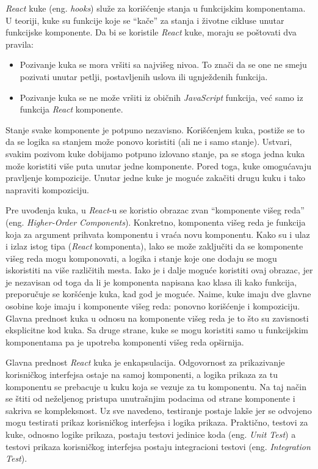 \textit{React} kuke (eng. \textit{hooks}) služe za korišćenje stanja u funkcijskim komponentama. U teoriji, kuke su funkcije 
koje se “kače” za stanja i životne cikluse unutar funkcijske komponente. Da bi se koristile \textit{React} kuke, moraju se 
poštovati dva pravila:
\begin{itemize}
    \item Pozivanje kuka se mora vršiti sa najvišeg nivoa. To znači da se one ne smeju pozivati unutar petlji, 
    postavljenih uslova ili ugnježdenih funkcija.
    \item Pozivanje kuka se ne može vršiti iz običnih \textit{JavaScript} funkcija, već samo iz funkcija \textit{React} komponente.
\end{itemize}

Stanje svake komponente je potpuno nezavisno. Korišćenjem kuka, postiže se to da se logika sa stanjem može ponovo koristiti 
(ali ne i samo stanje). Ustvari, svakim pozivom kuke dobijamo potpuno izlovano stanje, pa se stoga jedna kuka može koristiti 
više puta unutar jedne komponente. Pored toga, kuke omogućavaju pravljenje kompozicije. Unutar jedne kuke je moguće zakačiti 
drugu kuku i tako napraviti kompoziciju. 

Pre uvođenja kuka, u \textit{React}-u se koristio obrazac zvan “komponente višeg reda” (eng. \textit{Higher-Order Components}). 
Konkretno, komponenta višeg reda je funkcija koja za argument prihvata komponentu i vraća novu komponentu. Kako su i ulaz i 
izlaz istog tipa (\textit{React} komponenta), lako se može zaključiti da se komponente višeg reda mogu komponovati, a logika i 
stanje koje one dodaju se mogu iskoristiti na više različitih mesta. Iako je i dalje moguće koristiti ovaj obrazac, jer je 
nezavisan od toga da li je komponenta napisana kao klasa ili kako funkcija, preporučuje se koršćenje kuka, kad god je moguće. 
Naime, kuke imaju dve glavne osobine koje imaju i komponente višeg reda: ponovno korišćenje i kompoziciju. Glavna prednost kuka 
u odnosu na komponente višeg reda je to što su zavisnosti eksplicitne kod kuka. Sa druge strane, kuke se mogu koristiti samo u 
funkcijskim komponentama pa je upotreba komponenti višeg reda opširnija.

Glavna prednost \textit{React} kuka je enkapsulacija. Odgovornost za prikazivanje korisničkog interfejsa ostaje na samoj 
komponenti, a logika prikaza za tu komponentu se prebacuje u kuku koja se vezuje za tu komponentu. Na taj način se štiti 
od neželjenog pristupa unutrašnjim podacima od strane komponente i sakriva se kompleksnost. Uz sve navedeno, 
testiranje postaje lakše jer se odvojeno mogu testirati prikaz korisničkog interfejsa i logika prikaza. Praktično,
testovi za kuke, odnosno logike prikaza, postaju testovi jedinice koda (eng. \textit{Unit Test}) a testovi prikaza
korisničkog interfejsa postaju integracioni testovi (eng. \textit{Integration Test}).

